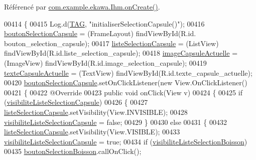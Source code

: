 Référencé par \hyperlink{_ihm_8java_source_l00248}{com.\+example.\+ekawa.\+Ihm.\+on\+Create()}.


\begin{DoxyCode}
00414     \{
00415         Log.d(\hyperlink{classcom_1_1example_1_1ekawa_1_1_ihm_a95cd92c2acaf9f8982302da08d94f9aa}{TAG}, \textcolor{stringliteral}{"initialiserSelectionCapsule()"});
00416         \hyperlink{classcom_1_1example_1_1ekawa_1_1_ihm_a866bc916203a767c5f9def913b59175d}{boutonSelectionCapsule} = (FrameLayout) findViewById(R.id.
      bouton\_selection\_capsule);
00417         \hyperlink{classcom_1_1example_1_1ekawa_1_1_ihm_a0842447d70bca2098431fa532c1c94e8}{listeSelectionCapsule} = (ListView) findViewById(R.id.liste\_selection\_capsule);
00418         \hyperlink{classcom_1_1example_1_1ekawa_1_1_ihm_a82418c4769be80ea67628e2ae8e85ee4}{imageCapsuleActuelle} = (ImageView) findViewById(R.id.image\_selection\_capsule);
00419         \hyperlink{classcom_1_1example_1_1ekawa_1_1_ihm_a3a9c8a185607e09fed0df62e46925786}{texteCapsuleActuelle} = (TextView) findViewById(R.id.texte\_capsule\_actuelle);
00420         \hyperlink{classcom_1_1example_1_1ekawa_1_1_ihm_a866bc916203a767c5f9def913b59175d}{boutonSelectionCapsule}.setOnClickListener(\textcolor{keyword}{new} View.OnClickListener()
00421         \{
00422             @Override
00423             \textcolor{keyword}{public} \textcolor{keywordtype}{void} onClick(View v)
00424             \{
00425                 \textcolor{keywordflow}{if} (\hyperlink{classcom_1_1example_1_1ekawa_1_1_ihm_aa6b9cda83ef1aba8816fd43797fb7ab2}{visibiliteListeSelectionCapsule})
00426                 \{
00427                     \hyperlink{classcom_1_1example_1_1ekawa_1_1_ihm_a0842447d70bca2098431fa532c1c94e8}{listeSelectionCapsule}.setVisibility(View.INVISIBLE);
00428                     \hyperlink{classcom_1_1example_1_1ekawa_1_1_ihm_aa6b9cda83ef1aba8816fd43797fb7ab2}{visibiliteListeSelectionCapsule} = \textcolor{keyword}{false};
00429                 \}
00430                 \textcolor{keywordflow}{else}
00431                 \{
00432                     \hyperlink{classcom_1_1example_1_1ekawa_1_1_ihm_a0842447d70bca2098431fa532c1c94e8}{listeSelectionCapsule}.setVisibility(View.VISIBLE);
00433                     \hyperlink{classcom_1_1example_1_1ekawa_1_1_ihm_aa6b9cda83ef1aba8816fd43797fb7ab2}{visibiliteListeSelectionCapsule} = \textcolor{keyword}{true};
00434                     \textcolor{keywordflow}{if} (\hyperlink{classcom_1_1example_1_1ekawa_1_1_ihm_a874a157d2a92d1a386a06512f36182ff}{visibiliteListeSelectionBoisson})
00435                         \hyperlink{classcom_1_1example_1_1ekawa_1_1_ihm_a5aec848e98e7bd8b933b87e390de809e}{boutonSelectionBoisson}.callOnClick();

\end{DoxyCode}
